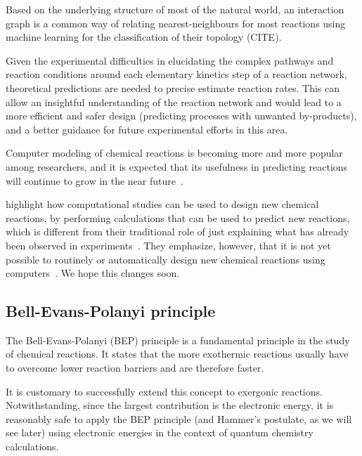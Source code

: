 Based on the underlying structure of most of the natural world,
an interaction graph is a common way of relating
nearest-neighbours for most reactions using machine learning
for the classification of their topology (CITE).

Given the experimental difficulties in elucidating the complex pathways and reaction conditions around each elementary kinetics step of a reaction network,
theoretical predictions are needed to precise estimate reaction rates.
This can allow an insightful understanding of the reaction network and would lead to a more efficient and safer design (predicting processes with unwanted by-products),
and a better guidance for future experimental efforts in this area.

Computer modeling of chemical reactions is becoming more and more popular among researchers,
and it is expected that its usefulness in predicting reactions will continue to grow in the near future~\cite{Ahn_2019}.

\citeauthor{Ahn_2019} highlight how computational studies can be used to design new chemical reactions,
by performing calculations that can be used to predict new reactions,
which is different from their traditional role of just explaining what has already been observed in experiments~\cite{Ahn_2019}.
They emphasize, however,
that it is not yet possible to routinely or automatically design new chemical reactions using computers~\cite{Ahn_2019}.
We hope this changes soon.


\subsection{Bell-Evans-Polanyi principle}

The Bell-Evans-Polanyi (BEP) principle is a fundamental principle in the study
of chemical reactions.
It states that the more exothermic reactions usually have to overcome lower
reaction barriers and are therefore faster.


It is customary to successfully extend this concept to exergonic reactions.
Notwithstanding,
since the largest contribution is the electronic energy,
it is reasonably
safe to apply the BEP principle (and Hammer's postulate,
as we will see later)
using electronic energies in the context of quantum chemistry calculations.

